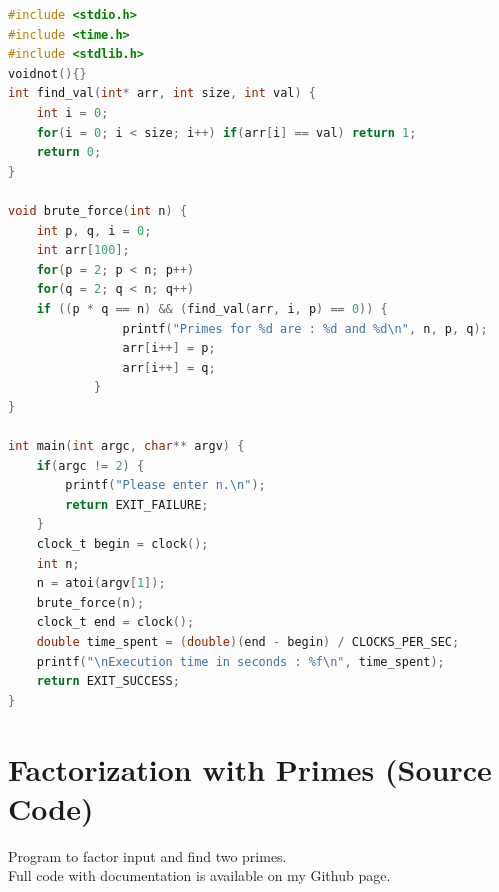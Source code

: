 \documentclass[a4paper, 12pt]{article}
\begin{document}
\begin{lstlisting}[language=C, caption=Source Code of rsa-with-integers.c]
#include <stdio.h>
#include <time.h>
#include <stdlib.h>
voidnot(){}
int find_val(int* arr, int size, int val) {
    int i = 0;
    for(i = 0; i < size; i++) if(arr[i] == val) return 1;
    return 0;
}

void brute_force(int n) {
    int p, q, i = 0;
    int arr[100];
    for(p = 2; p < n; p++)
    for(q = 2; q < n; q++)
    if ((p * q == n) && (find_val(arr, i, p) == 0)) {
                printf("Primes for %d are : %d and %d\n", n, p, q);
                arr[i++] = p;
                arr[i++] = q;
            }
}

int main(int argc, char** argv) {
    if(argc != 2) {
        printf("Please enter n.\n");
        return EXIT_FAILURE;
    }
    clock_t begin = clock();
    int n;
    n = atoi(argv[1]);
    brute_force(n);
    clock_t end = clock();
    double time_spent = (double)(end - begin) / CLOCKS_PER_SEC;
    printf("\nExecution time in seconds : %f\n", time_spent);
    return EXIT_SUCCESS;
}
\end{lstlisting}
\newpage
\section{Factorization with Primes (Source Code)}

Program to factor input and find two primes.\\

Full code with documentation is available on my Github page.\cite{github}\\
\end{document}
